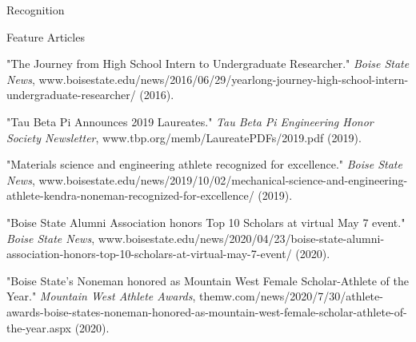 \documentclass{resume} %
\begin{document}
\begin{rSection}{Recognition}
\begin{rSubsection3}{Feature Articles}{}{}{}
\item "The Journey from High School Intern to Undergraduate Researcher." \textit{Boise State News}, www.boisestate.edu/news/2016/06/29/yearlong-journey-high-school-intern-undergraduate-researcher/ (2016).
\item "Tau Beta Pi Announces 2019 Laureates." \textit{Tau Beta Pi Engineering Honor Society Newsletter}, www.tbp.org/memb/LaureatePDFs/2019.pdf (2019).
\item "Materials science and engineering athlete recognized for excellence." \textit{Boise State News}, www.boisestate.edu/news/2019/10/02/mechanical-science-and-engineering-athlete-kendra-noneman-recognized-for-excellence/ (2019).
\item "Boise State Alumni Association honors Top 10 Scholars at virtual May 7 event." \textit{Boise State News}, www.boisestate.edu/news/2020/04/23/boise-state-alumni-association-honors-top-10-scholars-at-virtual-may-7-event/ (2020).
\item "Boise State's Noneman honored as Mountain West Female Scholar-Athlete of the Year." \textit{Mountain West Athlete Awards}, themw.com/news/2020/7/30/athlete-awards-boise-states-noneman-honored-as-mountain-west-female-scholar-athlete-of-the-year.aspx (2020).
\end{rSubsection3}
\end{rSection}
\newpage
\end{document}
